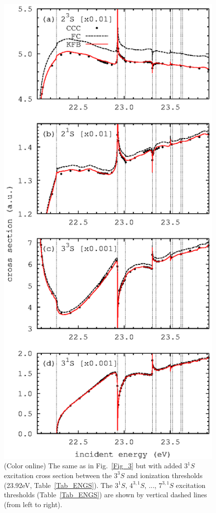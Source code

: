 \documentclass[aip
, pra
, showpacs
, aps
, twocolumn
, groupedaddress
, floatfix
]{revtex4}
\begin{document}
\begin{figure}[htb]
\includegraphics[scale=1]{fig4.ps}
\caption{(Color online)
The same as in Fig.~\ref{Fig_3} but with added $3^1S$ excitation cross section
between the $3^3S$ and ionization thresholds (23.92eV, Table~\ref{Tab_ENGS}).
The $3^1S$, $4^{3,1}S$, ..., $7^{3,1}S$ excitation thresholds (Table~\ref{Tab_ENGS})
are shown by vertical dashed lines (from left to right).
}
\label{Fig_4}
\end{figure}
\end{document}
